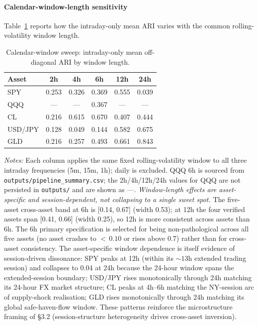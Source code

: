 \documentclass[preprint,12pt,authoryear]{elsarticle}
\newcommand{\SPY}{SPY}
\newcommand{\CL}{CL}
\newcommand{\USDJPY}{USD/JPY}
\newcommand{\GLD}{GLD}
\begin{document}
\paragraph{Calendar-window-length sensitivity}
Table~\ref{tab:window_sweep} reports how the intraday-only mean ARI varies with the common rolling-volatility window length.

\begin{table}[H]
\centering
\small
\setlength{\tabcolsep}{5pt}
\caption{Calendar-window sweep: intraday-only mean off-diagonal ARI by window length.}
\label{tab:window_sweep}
\begin{tabular}{lccccc}
\toprule
Asset & 2h & 4h & 6h & 12h & 24h \\
\midrule
SPY & 0.253 & 0.326 & 0.369 & 0.555 & 0.039 \\
QQQ & --- & --- & 0.367 & --- & --- \\
CL & 0.216 & 0.615 & 0.670 & 0.407 & 0.444 \\
USD/JPY & 0.128 & 0.049 & 0.144 & 0.582 & 0.675 \\
GLD & 0.216 & 0.257 & 0.493 & 0.661 & 0.843 \\
\bottomrule
\end{tabular}
\par\medskip
{\footnotesize\justifying
\textit{Notes:} Each column applies the same fixed rolling-volatility window to all three intraday frequencies (5m, 15m, 1h); daily is excluded. QQQ 6h is sourced from \texttt{outputs/pipeline\_summary.csv}; the 2h/4h/12h/24h values for QQQ are not persisted in \texttt{outputs/} and are shown as ---. \emph{Window-length effects are asset-specific and session-dependent, not collapsing to a single sweet spot.} The five-asset cross-asset band at 6h is [0.14, 0.67] (width 0.53); at 12h the four verified assets span [0.41, 0.66] (width 0.25), so 12h is more consistent across assets than 6h. The 6h primary specification is selected for being non-pathological across all five assets (no asset crashes to ${<}\,0.10$ or rises above 0.7) rather than for cross-asset consistency. The asset-specific window dependence is itself evidence of session-driven dissonance: \SPY{} peaks at 12h (within its $\sim 13$h extended trading session) and collapses to 0.04 at 24h because the 24-hour window spans the extended-session boundary; \USDJPY{} rises monotonically through 24h matching its 24-hour FX market structure; \CL{} peaks at 4h--6h matching the NY-session arc of supply-shock realisation; \GLD{} rises monotonically through 24h matching its global safe-haven-flow window. These patterns reinforce the microstructure framing of \S{}3.2 (session-structure heterogeneity drives cross-asset inversion).
\par}
\end{table}
\end{document}
